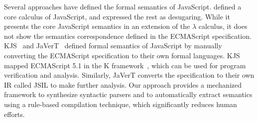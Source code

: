 Several approaches have defined the formal semantics of JavaScript.
\citet{lambdajs} defined a core calculus of JavaScript, and expressed the
rest as desugaring.  While it presents the core JavaScript semantics in
an extension of the $\lambda$ calculus, it does not show the semantics
correspondence defined in the ECMAScript specification.  KJS~\cite{kjs} and
JaVerT~\cite{javert} defined formal semantics of JavaScript by manually converting
the ECMAScript specification to their own formal languages.  KJS mapped
ECMAScript 5.1 in the K framework~\cite{kframework}, which can be used
for program verification and analysis.  Similarly, JaVerT converts the
specification to their own IR called JSIL to make further analysis.
Our approach provides a mechanized framework to synthesize syntactic parsers and
to automatically extract semantics
using a rule-based compilation technique, which significantly reduces human
efforts.

